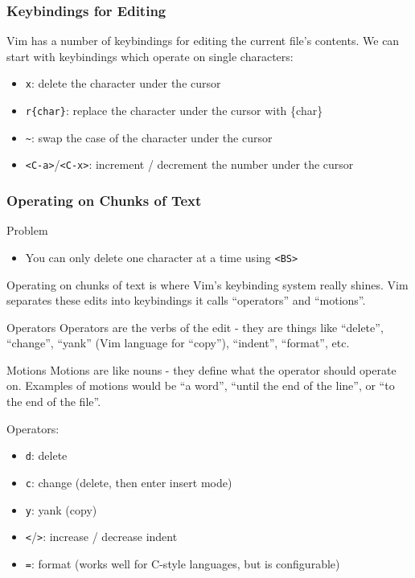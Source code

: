 \documentclass{beamer}
\begin{document}
\begin{frame}[fragile]
    \frametitle{Keybindings for Editing}
    Vim has a number of keybindings for editing the current file's contents. We can start with keybindings which operate on single characters:
    \begin{itemize}
	\item \verb+x+:  delete the character under the cursor
	\item \verb+r{char}+:  replace the character under the cursor with \{char\}
	\item \verb+~+:  swap the case of the character under the cursor
	\item \verb+<C-a>+/\verb+<C-x>+:  increment / decrement the number under the cursor
    \end{itemize}
\end{frame}

\begin{frame}[fragile]
    \frametitle{Operating on Chunks of Text}
    \begin{block}{Problem}
	\begin{itemize}
	    \item You can only delete one character at a time using \verb+<BS>+
	\end{itemize}
    \end{block}
    Operating on chunks of text is where Vim's keybinding system really shines. Vim separates these edits into keybindings it calls \enquote{operators} and \enquote{motions}.
    \begin{block}{Operators}
	Operators are the verbs of the edit - they are things like \enquote{delete}, \enquote{change}, \enquote{yank} (Vim language for \enquote{copy}), \enquote{indent}, \enquote{format}, etc.
    \end{block}
    \begin{block}{Motions}
	Motions are like nouns - they define what the operator should operate on. Examples of motions would be \enquote{a word}, \enquote{until the end of the line}, or \enquote{to the end of the file}.
    \end{block}
\end{frame}

\begin{frame}[fragile]
    Operators:
    \begin{itemize}
	\item \verb+d+:  delete
	\item \verb+c+:  change (delete, then enter insert mode)
	\item \verb+y+:  yank (copy)
	\item \verb+<+/\verb+>+:  increase / decrease indent
	\item \verb+=+:  format (works well for C-style languages, but is configurable)
    \end{itemize}
\end{frame}
\end{document}
